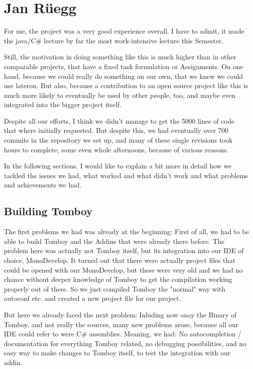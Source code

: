 \documentclass[11pt,a4paper,titlepage]{article}
\begin{document}


\section{Jan Rüegg}

For me, the project was a very good experience overall. I have to admit, it made the java/C\# lecture by far the most work-intensive lecture this Semester.

Still, the motivation in doing something like this is much higher than in other comparable projects, that have a fixed task formulation or Assignments. On one hand, because we could really do something on our own, that we knew we could use lateron. But also, because a contribution to an open source project like this is much more likely to eventually be used by other people, too, and maybe even integrated into the bigger project itself.

Despite all our efforts, I think we didn't manage to get the 5000 lines of code that where initially requested. But despite this, we had eventually over 700 commits in the repository we set up, and many of these single revisions took hours to complete, some even whole afternoons, because of various reasons.

In the following sections, I would like to explain a bit more in detail how we tackled the issues we had, what worked and what didn't work and what problems and achievements we had.

\subsection{Building Tomboy}
The first problems we had was already at the beginning: First of all, we had to be able to build Tomboy and the Addins that were already there before. The problem here was actually not Tomboy itself, but its integration into our IDE of choice, MonoDevelop. It turned out that there were actually project files that could be opened with our MonoDevelop, but these were very old and we had no chance without deeper knowledge of Tomboy to get the compilation working properly out of there. So we just compiled Tomboy the "normal" way with autoconf etc. and created a new project file for our project.

But here we already faced the next problem: Inluding now onay the Binary of Tomboy, and not really the sources, many new problems arose, because all our IDE could refer to were C\# assemblies. Meaning, we had: No autocompletion / documentation for everything Tomboy related, no debugging possibilities, and no easy way to make changes to Tomboy itself, to test the integration with our addin.
\end{document}
